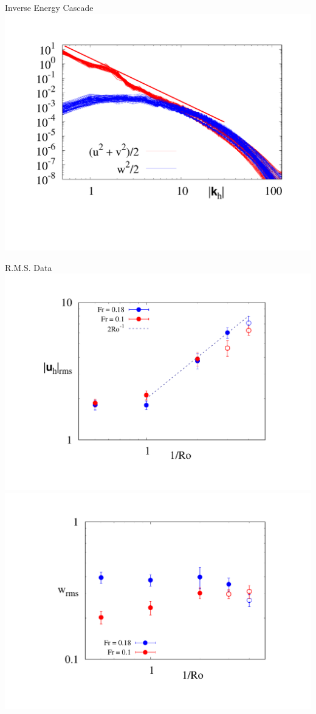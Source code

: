 \documentclass{beamer}
\begin{document}
\begin{frame}{Inverse Energy Cascade}
        \includegraphics[width=\textwidth]{images/Om5Spec.pdf}
    \emp

\end{frame}
\begin{frame}{R.M.S. Data}
        \centering
        \includegraphics[width=1\textwidth]{images/urms_plot.pdf}
    \emp
        \centering
        \includegraphics[width=.96\textwidth]{images/wrms_plot.pdf}
    \emp
    
\end{frame}
\end{document}
